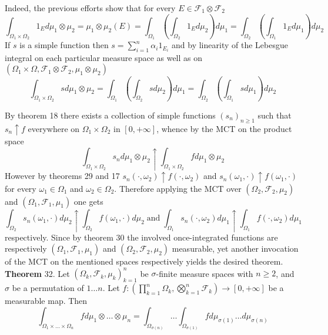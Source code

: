 \documentclass[a4paper]{article}
\newcommand{\clo}[1]{\left [ #1 \right ]}
\newcommand{\brac}[1]{\left ( #1 \right )}
\newcommand{\Zinf}{\clo{ 0, +\infty }}
\newcommand{\Fcal}{\mathcal{F}}
\begin{document}
Indeed, the previous efforts show that for every $E\in \Fcal_1\otimes\Fcal_2$\[\int_{\Omega_1\times\Omega_2} 1_E d\mu_1\otimes\mu_2 = \mu_1\otimes\mu_2\brac{E} = \int_{\Omega_1}\brac{\int_{\Omega_2} 1_E d\mu_2} d\mu_1 = \int_{\Omega_2}\brac{\int_{\Omega_1} 1_E d\mu_1} d\mu_2\] If $s$ is a simple function then $s = \sum_{i=1}^n \alpha_i 1_{E_i}$ and by linearity of the Lebesgue integral on each particular measure space as well as on $\brac{\Omega_1\times \Omega, \Fcal_1\otimes \Fcal_2, \mu_1\otimes\mu_2}$ \[\int_{\Omega_1\times\Omega_2} s d\mu_1\otimes\mu_2 = \int_{\Omega_1}\brac{\int_{\Omega_2} s d\mu_2} d\mu_1 = \int_{\Omega_2}\brac{\int_{\Omega_1} s d\mu_1} d\mu_2\]

By theorem 18 there exists a collection of simple functions $\brac{s_n}_{n\geq 1}$ such that $s_n\uparrow f$ everywhere on $\Omega_1\times\Omega_2$ in $\Zinf$, whence by the MCT on the product space \[\int_{\Omega_1\times\Omega_2} s_n d\mu_1\otimes\mu_2\uparrow \int_{\Omega_1\times\Omega_2} f d\mu_1\otimes\mu_2\] However by theorems 29 and 17 $s_n\brac{\cdot, \omega_2}\uparrow f\brac{\cdot, \omega_2}$ and $s_n\brac{\omega_1, \cdot}\uparrow f\brac{\omega_1, \cdot}$ for every $\omega_1\in \Omega_1$ and $\omega_2\in\Omega_2$. Therefore applying the MCT over $\brac{\Omega_2, \Fcal_2, \mu_2}$ and $\brac{\Omega_1, \Fcal_1, \mu_1}$ one gets \[\int_{\Omega_2} s_n\brac{\omega_1, \cdot} d\mu_2\uparrow \int_{\Omega_2} f\brac{\omega_1, \cdot} d\mu_2\;\text{and}\;\int_{\Omega_1} s_n\brac{\cdot, \omega_2} d\mu_1\uparrow \int_{\Omega_1} f\brac{\cdot, \omega_2} d\mu_1\] respectively. Since by theorem 30 the involved once-integrated functions are respectively $\brac{\Omega_1, \Fcal_1, \mu_1}$ and $\brac{\Omega_2, \Fcal_2, \mu_2}$ measurable, yet another invocation of the MCT on the mentioned spaces respectively yields the desired theorem.\\

\label{thm:fubini3} \noindent \textbf{Theorem} 32.
Let $\brac{\Omega_k, \Fcal_k, \mu_k}_{k=1}^n$ be $\sigma$-finite measure spaces with $n\geq 2$, and $\sigma$ be a permutation of $1\ldots n$. Let $f:\brac{\prod_{k=1}^n \Omega_k, \bigotimes_{k=1}^n \Fcal_k } \to \Zinf$ be a measurable map. Then \[\int_{\Omega_1\times \ldots \times\Omega_n} f d\mu_1\otimes \ldots \otimes\mu_n = \int_{\Omega_{\sigma\brac{ n } } } \ldots  \int_{\Omega_{\sigma\brac{ 1 } } } f d\mu_{\sigma\brac{ 1 } } \ldots d\mu_{\sigma\brac{ n } } \]
\end{document}

